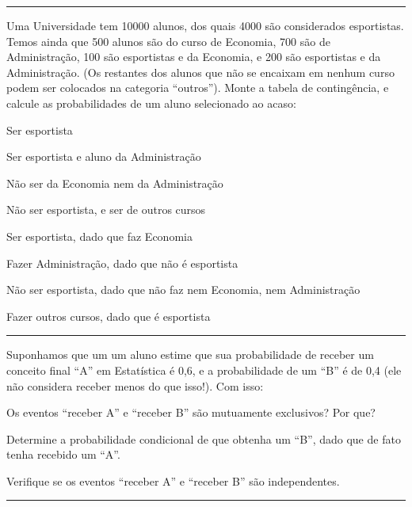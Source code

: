\documentclass[a4paper,11pt,fleqn]{article}\usepackage[]{graphicx}\usepackage[]{color}
\theoremstyle{definition}
\begin{document}
\begin{compactenum}
\vspace{0.3cm}
\hrule
\vspace{0.3cm}

\item Uma Universidade tem 10000 alunos, dos quais 4000 são considerados
  esportistas. Temos ainda que 500 alunos são do curso de Economia, 700
  são de Administração, 100 são esportistas e da Economia, e 200 são
  esportistas e da Administração. (Os restantes dos alunos que não se
  encaixam em nenhum curso podem ser colocados na categoria
  ``outros''). Monte a tabela de contingência, e calcule as
  probabilidades de um aluno selecionado ao acaso:
  \begin{compactenum}
  \item Ser esportista
  \item Ser esportista e aluno da Administração
  \item Não ser da Economia nem da Administração
  \item Não ser esportista, e ser de outros cursos
  \item Ser esportista, dado que faz Economia
  \item Fazer Administração, dado que não é esportista
  \item Não ser esportista, dado que não faz nem Economia, nem
    Administração
  \item Fazer outros cursos, dado que é esportista
  \end{compactenum}

\vspace{0.3cm}
\hrule
\vspace{0.3cm}

\item Suponhamos que um um aluno estime que sua probabilidade de receber um
  conceito final ``A'' em Estatística é 0,6, e a probabilidade de um
  ``B'' é de 0,4 (ele não considera receber menos do que isso!). Com isso:
  \begin{compactenum}
  \item Os eventos ``receber A'' e ``receber B'' são mutuamente
    exclusivos? Por que?
  \item Determine a probabilidade condicional de que obtenha um ``B'',
    dado que de fato tenha recebido um ``A''.
  \item Verifique se os eventos ``receber A'' e ``receber B'' são
    independentes.
  \end{compactenum}

\vspace{0.3cm}
\hrule
\vspace{0.3cm}


\end{compactenum}
\end{document}
